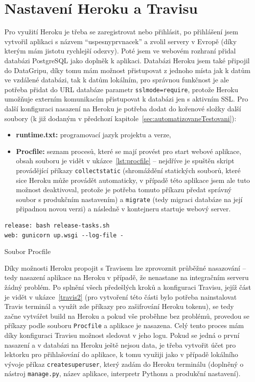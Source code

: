     \section{Nastavení Heroku a Travisu}
    Pro využití Heroku je třeba se zaregistrovat nebo přihlásit, po přihlášení jsem vytvořil aplikaci s názvem \enquote{uspesnyprvnacek} a zvolil servery v Evropě (díky kterým mám jistotu rychlejší odezvy). Poté jsem ve webovém rozhraní přidal databázi PostgreSQL jako doplněk k aplikaci. Databázi Heroku jsem také připojil do DataGripu, díky tomu mám možnost přistupovat z jednoho místa jak k datům ve vzdálené databázi, tak k datům lokálním, pro správnou funkčnost je ale potřeba přidat do URL databáze parametr \verb|sslmode=require|, protože Heroku umožňuje externím komunikacím přistupovat k databázi jen s aktivním SSL. Pro další konfiguraci nasazení na Heroku je potřeba dodat do kořenové složky další soubory (k již dodaným v předchozí kapitole~\ref{sec:automatizovaneTestovani}):
    \begin{itemize}
        \item \textbf{runtime.txt:} programovací jazyk projektu a verze,
        \item \textbf{Procfile:} seznam procesů, které se mají provést pro start webové aplikace, obsah souboru je vidět v ukázce~\ref{lst:procfile} -- nejdříve je spuštěn skript provádějící příkazy \verb|collectstatic| (shromáždění statických souborů, které sice Heroku může provádět automaticky, v případě této aplikace jsem ale tuto možnost deaktivoval, protože je potřeba tomuto příkazu předat správný soubor s produkčním nastavením) a \verb|migrate| (tedy migraci databáze na její připadnou novou verzi) a následně v kontejneru startuje webový server.
    \end{itemize}
    
    \begin{listing}[ht]
    	\begin{verbatim}
release: bash release-tasks.sh
web: gunicorn up.wsgi --log-file -
    	\end{verbatim}
    	\caption{Soubor Procfile}\label{lst:procfile}
    \end{listing}
    
    Díky možnosti Heroku propojit s Travisem \cite{travis-heroku} lze zprovoznit průběžné nasazování -- tedy nasazení aplikace na Heroku v případě, že nenastane na integračním serveru žádný problém. Po splnění všech předešlých kroků a konfiguraci Travisu, jejíž část je vidět v ukázce~\ref{travis2} (pro vytvoření této části bylo potřeba nainstalovat Travis terminál a využít zde příkazy pro zašifrování Heroku tokenu), se tedy začne vytvářet build na Heroku a pokud vše proběhne bez problémů, provedou se příkazy podle souboru \verb|Procfile| a aplikace je nasazena. Celý tento proces mám díky konfiguraci Travisu možnost sledovat v jeho logu. Pokud se jedná o první nasazení a v databázi na Heroku ještě nejsou data, je třeba vytvořit účet pro lektorku pro přihlašování do aplikace, k tomu využiji jako v případě lokálního vývoje příkaz \verb|createsuperuser|, který zadám do Heroku terminálu (doplněný o nástroj \verb|manage.py|, název aplikace, interpretr Pythonu a produkční nastavení).
    
